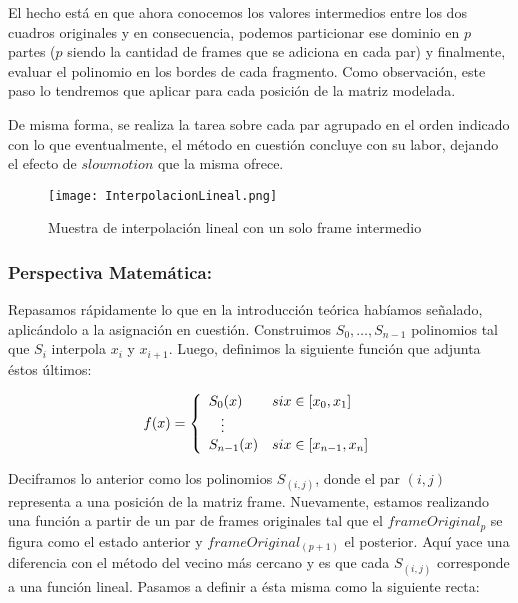 El hecho est\'a en que ahora conocemos los valores intermedios entre los dos cuadros originales y en consecuencia, podemos particionar ese dominio en $p$ partes ($p$ siendo la cantidad de frames que se adiciona en cada par) y finalmente, evaluar el polinomio en los bordes de cada fragmento. Como observaci\'on, este paso lo tendremos que aplicar para cada posici\'on de la matriz modelada.

De misma forma, se realiza la tarea sobre cada par agrupado en el orden indicado con lo que eventualmente, el m\'etodo en cuesti\'on concluye con su labor, dejando el efecto de $slowmotion$ que la misma ofrece.

\begin{figure}[h!]
  \centering
    \texttt{[image: InterpolacionLineal.png]}
     \caption{Muestra de interpolaci\'on lineal con un solo frame intermedio}\label{fig:vecino}
\end{figure}
\noindent

\subsubsection*{\bf{Perspectiva Matem\'atica:}}

Repasamos r\'apidamente lo que en la introducci\'on te\'orica hab\'iamos señalado, aplic\'andolo a la asignaci\'on en cuesti\'on. Construimos $S_0, \ldots, S_{n - 1}$ polinomios tal que $S_i$ interpola $x_i$ y $x_{i + 1}$. Luego, definimos la siguiente funci\'on que adjunta \'estos \'ultimos:
 
\[
f(x) = 
\left\{
    \begin{array}{ll}
        S_0(x)  & \mbox{si } x \in [x_{0}, x_1] \\
        \hspace{0.3cm}\vdots \\     
        S_{n - 1}(x) & \mbox{si } x \in [x_{n - 1}, x_n]
    \end{array}
\right.
\]

Deciframos lo anterior como los polinomios $S_{(i,j)}$, donde el par $(i,j)$ representa a una posici\'on de la matriz frame. Nuevamente, estamos realizando una funci\'on a partir de un par de frames originales tal que el $frameOriginal_{p}$ se figura como el estado anterior y $frameOriginal_{(p+1)}$ el posterior. Aqu\'i yace una diferencia con el m\'etodo del vecino m\'as cercano y es que cada $S_{(i,j)}$ corresponde a una funci\'on lineal. Pasamos a definir a \'esta misma como la siguiente recta:


